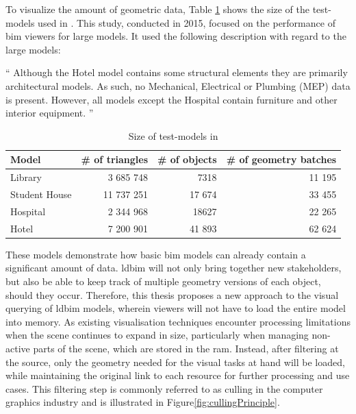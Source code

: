 To visualize the amount of geometric data, Table \ref{tab:sizeModels} shows the size of the test-models used in \cite{Johansson2015}. This study, conducted in 2015, focused on the performance of \ac{bim} viewers for large models. It used the following description with regard to the large models:

\enquote{
    Although the Hotel model contains some structural elements they are primarily architectural models. As such, no Mechanical, Electrical or Plumbing (MEP) data is present. However, all models except the Hospital contain furniture and other interior equipment.
} \parencite{Johansson2015}

\begin{table}[h]
    \centering
    \begin{tabular}{@{}lrrr@{}}
        \toprule
        Model         & \multicolumn{1}{l}{\# of  triangles} & \multicolumn{1}{l}{\# of objects} & \multicolumn{1}{l}{\# of geometry batches} \\ \midrule
        Library       & 3 685 748                            & 7318                              & 11 195                                     \\
        Student House & 11 737 251                           & 17 674                            & 33 455                                     \\
        Hospital      & 2 344 968                            & 18627                             & 22 265                                     \\
        Hotel         & 7 200 901                            & 41 893                            & 62 624                                     \\ \bottomrule
    \end{tabular}
    \caption{Size of test-models in \cite{Johansson2015}}
    \label{tab:sizeModels}
\end{table}

These models demonstrate how basic \ac{bim} models can already contain a significant amount of data. \ac{ldbim} will not only bring together new stakeholders, but also be able to keep track of multiple geometry versions of each object, should they occur. Therefore, this thesis proposes a new approach to the visual querying of \ac{ldbim} models, wherein viewers will not have to load the entire model into memory. As existing visualisation techniques encounter processing limitations when the scene continues to expand in size, particularly when managing non-active parts of the scene, which are stored in the \ac{ram}. Instead, after filtering at the source, only the geometry needed for the visual tasks at hand will be loaded, while maintaining the original link to each resource for further processing and use cases. This filtering step is commonly referred to as culling in the computer graphics industry and is illustrated in Figure\ref{fig:cullingPrinciple}.

